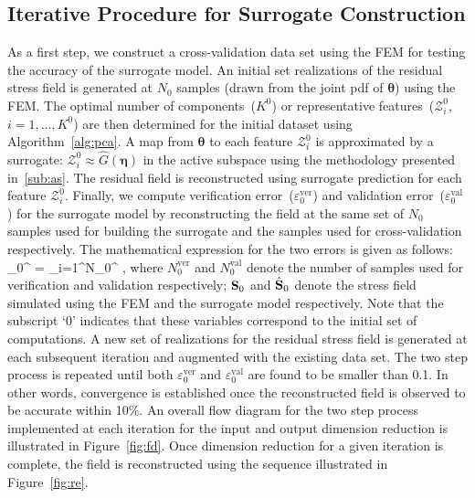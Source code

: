 \subsection{Iterative Procedure for Surrogate Construction}
\label{sub:pcas}

As a first step, we construct a cross-validation data set using the FEM
 for testing the accuracy of the surrogate model. 
An initial set realizations of the residual stress field is generated at $N_0$ samples 
(drawn from the joint pdf of $\bm{\theta}$) using the FEM. 
The optimal number of components~($K^0$) or representative features~($\mathcal{Z}_i^0$, $i=1,\ldots,K^0$)
are then determined for
the initial dataset using Algorithm~\ref{alg:pca}. A map from $\bm{\theta}$ to each feature $\mathcal{Z}_i^0$
is approximated by a surrogate: $\mathcal{Z}_i^0\approx \hat{G}(\bm{\eta})$ in the active subspace using
the methodology presented in~\ref{sub:as}. The residual field is reconstructed using surrogate 
prediction for each feature $\mathcal{Z}_i^0$. Finally, we compute verification error~($\varepsilon_0^{\text{ver}}$)
and validation error~($\varepsilon_0^{\text{val}}$)
for the surrogate model by reconstructing the field at the same set of $N_0$
samples used for building the surrogate and the samples used for cross-validation respectively. 
The mathematical expression for the two errors is given as
follows:
%
\be
\varepsilon_0^{} = 
\sum\limits_{i=1}^{N_0^{}} ,
\label{eq:check}
\ee
%
where $N_0^{\text{ver}}$ and $N_0^{\text{val}}$ denote the number of samples used for verification and validation
respectively; $\mathbf{{S}}_0$ and $\hat{\mathbf{{S}}}_0$ denote the stress field simulated using the FEM and the 
surrogate model respectively. Note that the subscript `0' indicates that these variables correspond to the initial set
of computations. 
A new set of realizations for the residual stress field is generated at each subsequent iteration
and augmented with the existing data set. The two step process is repeated until both $\varepsilon_0^{\text{ver}}$
and $\varepsilon_0^{\text{val}}$ are found to be smaller than 0.1. In other words, convergence is established 
once the reconstructed field is observed to be accurate within 10$\%$. An overall flow diagram for the two
step process implemented at each iteration for the input and output dimension reduction is illustrated in
Figure~\ref{fig:fd}. Once dimension reduction for a given iteration is complete, the field is reconstructed
using the sequence illustrated in Figure~\ref{fig:re}.
